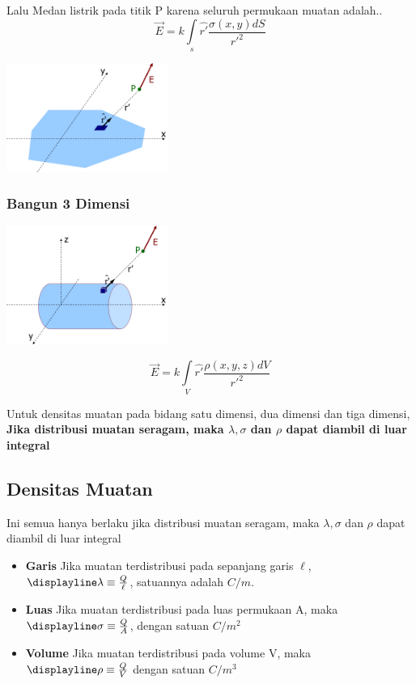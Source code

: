 \documentclass[twocolumn, 11pt]{article}%
\begin{document}
    Lalu Medan listrik pada titik P karena seluruh permukaan muatan adalah..
    \[\vec E=k\int\limits_s \hat{r'} \frac{\sigma(x,y) dS}{r'^2} \]
    \begin{center}
        \includegraphics[width=200px]{5.png}
    \end{center}

    \subsubsection{Bangun 3 Dimensi}%
    \begin{center}
        \includegraphics[width=200px]{6.png}
    \end{center}
    
    \[\vec E=k\int\limits_V \hat{r'} \frac{\rho(x,y,z) dV}{r'^2} \]

    Untuk densitas muatan pada bidang satu dimensi, dua dimensi dan tiga dimensi, \textbf{Jika distribusi muatan seragam, maka $\lambda, \sigma$ dan $\rho$ dapat diambil di luar integral} 

    \subsection{Densitas Muatan}%
    Ini semua hanya berlaku jika distribusi muatan seragam, maka $\lambda, \sigma$ dan $\rho$ dapat diambil di luar integral
    \begin{itemize}
        \item \textbf{Garis} Jika muatan terdistribusi pada sepanjang garis $\ell$, $\displayline \lambda \equiv \frac{Q}{\ell}$, satuannya adalah $C/m$.
        \item \textbf{Luas} Jika muatan terdistribusi pada luas permukaan A, maka $\displayline \sigma \equiv \frac{Q}{A}$, dengan satuan $C/m^2$
        \item \textbf{Volume} Jika muatan terdistribusi pada volume V, maka $\displayline \rho \equiv \frac{Q}{V}$ dengan satuan $C/m^3$
    \end{itemize}
\end{document}
